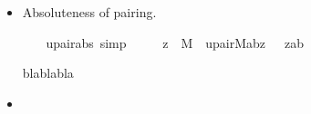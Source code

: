 \begin{itemize}
  \item Absoluteness of pairing.
\begin{isabellebody}
\ \ \isanewline
{}\isamarkupfalse%
\ upair{\isacharunderscore}abs\ {\isacharbrackleft}simp{\isacharbrackright}{\isacharcolon}\isanewline
\ \ \ \ \ {\isachardoublequoteopen}z\ {\isasymin}\ M\ {\isasymLongrightarrow}\ upair{\isacharparenleft}{\isacharhash}{\isacharhash}M{\isacharcomma}a{\isacharcomma}b{\isacharcomma}z{\isacharparenright}\ \ {\isasymlongleftrightarrow}\ z{\isacharequal}{\isacharbraceleft}a{\isacharcomma}b{\isacharbraceright}{\isachardoublequoteclose}\isanewline
\end{isabellebody}

blablabla

  \item 

\end{itemize}
